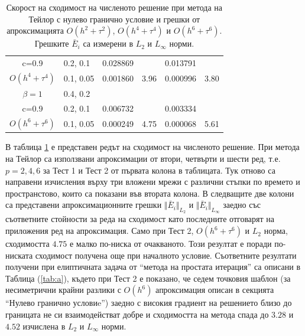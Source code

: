 \documentclass{article}
\newcommand{\rf}[1]{(\ref{#1})}
\begin{document}
\begin{table}[ht]
\begin{tabular}{||c|l|ll|ll||}
       c=0.9                 &0.2, 0.1     & 0.028869   &        &  0.013791   &   \\
 $O(h^4+ \tau^4)$ 	&0.1, 0.05   	&0.001860 	& 3.96  & 0.000996  & 3.80  \\
\hline
  $\beta=1$     		&0.4, 0.2   	&            	&          	&                  &      \\
      c=0.9                  &0.2, 0.1   	&0.006732 	&            & 0.003334      &       \\
 $O(h^6+ \tau^6)$ 	&0.1, 0.05 	& 0.000249 	& 4.75 	& 0.000068  & 5.61        \\
\hline
\hline 
		\end{tabular}
		\caption{Скорост на сходимост на численото решение при метода на Тейлор с нулево гранично условие и грешки от апроксимацията $O(h^{2} + \tau^2 )$, $O(h^{4} + \tau^4 )$ и $O(h^{6} + \tau^6 )$. Грешките $\bar E_i$ са измерени в $L_2$ и $L_\infty$ норми.}
\label{tableA}
\end{table}
В таблица \ref{tableA} е представен редът на сходимост на численото решение. При метода на Тейлор са използвани апроксимации от втори, четвърти и шести ред, т.е. $p=2,4,6$ за Тест 1 и Тест 2 от първата колона в таблицата. Тук отново са направени изчисления върху три вложени мрежи с различни стъпки по времето и пространстово, които са показани във втората колона. В следващите две колони са представени апроксимационните грешки $\Vert \bar E_i \Vert_{L_2} $ и $\Vert \bar E_i \Vert_{L_\infty}$ заедно със съответните стойности за реда на сходимост като последните отговарят на приложения ред на апроксимация. Само при Тест 2, $O(h^6 + \tau^6)$ и $L_2$ норма, сходимостта $4.75$ е малко по-ниска от очакваното. Този резултат е поради по-ниската сходимост получена още при началното условие. Съответните резултати получени при елиптичната задача от ``метода на простата итерация'' са описани в Таблица \rf{tab:a}, където при Тест 2 е показано, че седем точковия шаблон (за несиметрични крайни разлики с $O(h^6)$ апроксимация описан в секцията ``Нулево гранично условиe'') заедно с високия градиент на решението близо до границата не си взаимодействат добре и сходимостта на метода спада до $3.28$ и $4.52$ изчислена в $L_2$ и $L_\infty$ норми. 
\end{document}
